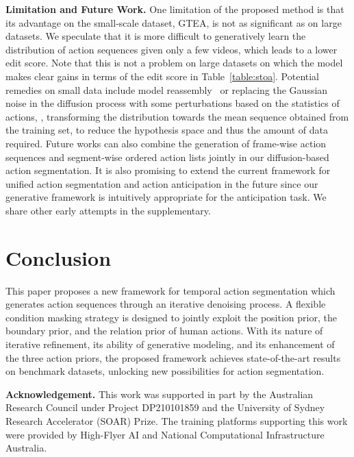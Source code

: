 \documentclass[10pt,twocolumn,letterpaper]{article}
\begin{document}
\textbf{Limitation and Future Work.}
One limitation of the proposed method is that its advantage on the small-scale dataset, GTEA, is not as significant as on large datasets.
We speculate that it is more difficult to generatively learn the distribution of action sequences given only a few videos, which leads to a lower edit score.
Note that this is not a problem on large datasets on which the model makes clear gains in terms of the edit score in Table~\ref{table:stoa}.
Potential remedies on small data include model reassembly~\cite{yang2022deep} or replacing the Gaussian noise in the diffusion process with some perturbations based on the statistics of actions, \eg, transforming the distribution towards the mean sequence obtained from the training set, to reduce the hypothesis space and thus the amount of data required.
Future works can also combine the generation of frame-wise action sequences and segment-wise ordered action lists jointly in our diffusion-based action segmentation.
It is also promising to extend the current framework for unified action segmentation and action anticipation in the future since our generative framework is intuitively appropriate for the anticipation task.
We share other early attempts in the supplementary.



\section{Conclusion}
This paper proposes a new framework for temporal action segmentation which generates action sequences through an iterative denoising process.
A flexible condition masking strategy is designed to jointly exploit the position
prior, the boundary prior, and the relation prior of human actions.
With its nature of iterative refinement, its ability of generative modeling, and its enhancement of the three action priors, the proposed framework achieves state-of-the-art results on benchmark datasets, unlocking new possibilities for action segmentation.

\textbf{Acknowledgement.}
This work was supported in part by the Australian Research Council under Project DP210101859 and the University of Sydney Research Accelerator (SOAR) Prize.
The training platforms supporting this work were provided by High-Flyer AI and National Computational Infrastructure Australia.


{\small


}
\end{document}
